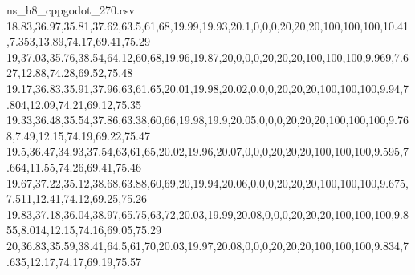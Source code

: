 \begin{filecontents*}[overwrite]{ns_h8_cppgodot_270.csv}
18.83,36.97,35.81,37.62,63.5,61,68,19.99,19.93,20.1,0,0,0,20,20,20,100,100,100,10.41,7.353,13.89,74.17,69.41,75.29
19,37.03,35.76,38.54,64.12,60,68,19.96,19.87,20,0,0,0,20,20,20,100,100,100,9.969,7.627,12.88,74.28,69.52,75.48
19.17,36.83,35.91,37.96,63,61,65,20.01,19.98,20.02,0,0,0,20,20,20,100,100,100,9.94,7.804,12.09,74.21,69.12,75.35
19.33,36.48,35.54,37.86,63.38,60,66,19.98,19.9,20.05,0,0,0,20,20,20,100,100,100,9.768,7.49,12.15,74.19,69.22,75.47
19.5,36.47,34.93,37.54,63,61,65,20.02,19.96,20.07,0,0,0,20,20,20,100,100,100,9.595,7.664,11.55,74.26,69.41,75.46
19.67,37.22,35.12,38.68,63.88,60,69,20,19.94,20.06,0,0,0,20,20,20,100,100,100,9.675,7.511,12.41,74.12,69.25,75.26
19.83,37.18,36.04,38.97,65.75,63,72,20.03,19.99,20.08,0,0,0,20,20,20,100,100,100,9.855,8.014,12.15,74.16,69.05,75.29
20,36.83,35.59,38.41,64.5,61,70,20.03,19.97,20.08,0,0,0,20,20,20,100,100,100,9.834,7.635,12.17,74.17,69.19,75.57
\end{filecontents*}

